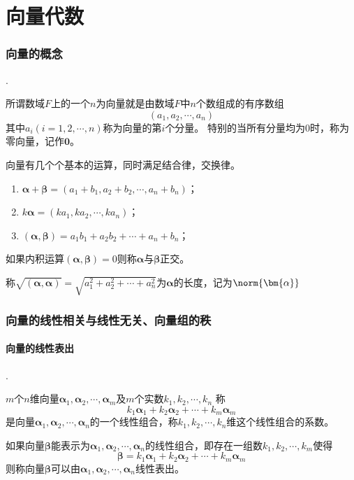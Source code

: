 \part{向量代数}
\section{向量的概念}
.
\begin{definition}
    所谓数域$F$上的一个$n$为向量就是由数域$F$中$n$个数组成的有序数组
    \[ (a_1,a_2,\cdots,a_n) \]
    其中$a_i(i=1,2,\cdots,n)$称为向量的第$i$个分量。
    特别的当所有分量均为$0$时，称为零向量，记作$\bm{0}$。
\end{definition}
向量有几个个基本的运算，同时满足结合律，交换律。
\begin{enumerate}[(1)]
    \item $\bm{\alpha}+\bm{\beta} = (a_1+b_1,a_2+b_2, \cdots, a_n+b_n)$；
    \item $k\bm{\alpha} = (ka_1,ka_2,\cdots,ka_n)$；
    \item $(\bm{\alpha},\bm{\beta}) = a_1b_1 + a_2b_2 + \cdots + a_n+b_n$；
\end{enumerate}
如果内积运算$(\bm{\alpha},\bm{\beta})=0$则称$\bm{\alpha}$与$\bm{\beta}$正交。

称$\sqrt{(\bm{\alpha},\bm{\alpha})} = \sqrt{a_1^2 +a_2^2 + \cdots + a_n^2}$为$\bm{\alpha}$的长度，记为$\norm{\bm{\alpha}}$

\section{向量的线性相关与线性无关、向量组的秩}
\subsection{向量的线性表出}
.
\begin{definition}
    $m$个$n$维向量$\bm{\alpha}_1,\bm{\alpha}_2,\cdots,\bm{\alpha}_m$及$m$个实数$k_1,k_2,\cdots,k_n$
    称
    \[ k_1\bm{\alpha}_1 + k_2\bm{\alpha}_2 + \cdots + k_m\bm{\alpha}_m \]
    是向量$\bm{\alpha}_1,\bm{\alpha}_2,\cdots,\bm{\alpha}_n$的一个线性组合，称$k_1,k_2,\cdots,k_n$维这个线性组合的系数。
\end{definition}

\begin{definition}
    如果向量$\bm{\beta}$能表示为$\bm{\alpha}_1,\bm{\alpha}_2,\cdots,\bm{\alpha}_n$的线性组合，即存在一组数$k_1,k_2,\cdots,k_m$使得
    \[ \bm{\beta} = k_1\bm{\alpha}_1 + k_2\bm{\alpha}_2 + \cdots + k_m\bm{\alpha}_m \]
    则称向量$\bm{\beta}$可以由$\bm{\alpha}_1,\bm{\alpha}_2,\cdots,\bm{\alpha}_n$线性表出。
\end{definition}

